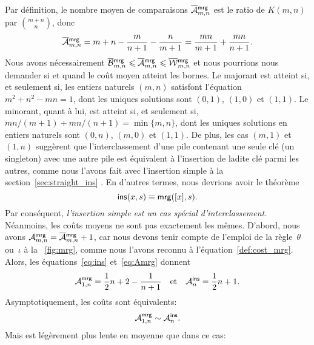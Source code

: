 Par définition, le nombre moyen de comparaisons
\(\OM{\fun{mrg}}{m,n}\) est le ratio
de \(K(m,n)\) par \(\binom{m+n}{n}\), donc
\begin{equation}
\OM{\fun{mrg}}{m,n} = m + n - \frac{m}{n+1} - \frac{n}{m+1}
  = \frac{mn}{m+1} + \frac{mn}{n+1}.
\label{eq:Amrg}
\end{equation}
Nous avons nécessairement \(\OB{\fun{mrg}}{m,n} \leqslant
\OM{\fun{mrg}}{m,n} \leqslant \OW{\fun{mrg}}{m,n}\) et nous pourrions
nous demander si et quand le coût moyen atteint les bornes. Le
majorant est atteint si, et seulement si, les entiers naturels
\((m,n)\) satisfont l'équation \(m^2 + n^2 - mn = 1\), dont les
uniques solutions sont \((0,1)\), \((1,0)\) et \((1,1)\). Le minorant,
quant à lui, est atteint si, et seulement si, \(mn/(m+1) + mn/(n+1) =
\min\{m,n\}\), dont les uniques solutions en entiers naturels sont
\((0,n)\), \((m,0)\) et \((1,1)\). De plus, les cas \((m,1)\) et
\((1,n)\) suggèrent que l'interclassement d'une pile contenant une
seule clé (un singleton) avec une autre pile est équivalent à
l'insertion de ladite clé parmi les autres, comme nous l'avons fait
avec l'insertion simple à la section~\ref{sec:straight_ins}
. En d'autres termes, nous devrions avoir
le théorème
\begin{equation}
\fun{ins}(x,s) \equiv \fun{mrg}([x],s).
\label{eq:ins_mrg}
\index{ins@\fun{ins/2}}\index{mrg@\fun{mrg/2}}
\end{equation}
Par conséquent, \emph{l'insertion simple est un cas spécial
  d'interclassement.} Néanmoins, les coûts moyens ne sont pas
exactement les mêmes. D'abord, nous avons \(\M{\fun{mrg}}{m,n} =
\OM{\fun{mrg}}{m,n} + 1\), car nous devons tenir compte de l'emploi de
la règle~\(\theta\) ou~\(\iota\) à la \fig~\vref{fig:mrg}, comme nous
l'avons reconnu à l'équation~\eqref{def:cost_mrg}. Alors, les
équations~\eqref{eq:ins}  et~\eqref{eq:Amrg} donnent
\begin{equation*}
\M{\fun{mrg}}{1,n} = \frac{1}{2}{n} + 2 - \frac{1}{n+1}\quad\text{et}\quad
\M{\fun{ins}}{n} = \frac{1}{2}{n} + 1.
\index{ins@$\M{\fun{ins}}{n}$}\index{mrg@$\M{\fun{mrg}}{1,n}$}
\end{equation*}
Asymptotiquement, les coûts sont équivalents:
\begin{equation*}
\M{\fun{mrg}}{1,n} \sim \M{\fun{ins}}{n}.
\end{equation*}
Mais  est légèrement plus lente en
moyenne que  dans ce cas:
